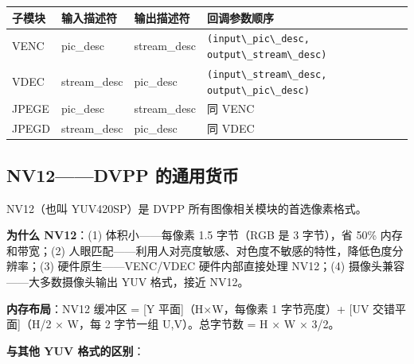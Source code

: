 \begin{longtable}[]{@{}
  >{\raggedright\arraybackslash}p{}
  >{\raggedright\arraybackslash}p{}
  >{\raggedright\arraybackslash}p{}
  >{\raggedright\arraybackslash}p{}@{}}
\toprule\noalign{}
\begin{minipage}[b]{\linewidth}\raggedright
子模块
\end{minipage} & \begin{minipage}[b]{\linewidth}\raggedright
输入描述符
\end{minipage} & \begin{minipage}[b]{\linewidth}\raggedright
输出描述符
\end{minipage} & \begin{minipage}[b]{\linewidth}\raggedright
回调参数顺序
\end{minipage} \\
\midrule\noalign{}
\endhead
\bottomrule\noalign{}
\endlastfoot
VENC & pic\_desc & stream\_desc &
\passthrough{\lstinline!(input\_pic\_desc, output\_stream\_desc)!} \\
VDEC & stream\_desc & pic\_desc &
\passthrough{\lstinline!(input\_stream\_desc, output\_pic\_desc)!} \\
JPEGE & pic\_desc & stream\_desc & 同 VENC \\
JPEGD & stream\_desc & pic\_desc & 同 VDEC \\
\end{longtable}

\subsection{NV12------DVPP 的通用货币}\label{nv12-format}

NV12（也叫 YUV420SP）是 DVPP 所有图像相关模块的首选像素格式。

\textbf{为什么 NV12}：(1) 体积小------每像素 1.5 字节（RGB 是 3
字节），省 50\% 内存和带宽；(2)
人眼匹配------利用人对亮度敏感、对色度不敏感的特性，降低色度分辨率；(3)
硬件原生------VENC/VDEC 硬件内部直接处理 NV12；(4)
摄像头兼容------大多数摄像头输出 YUV 格式，接近 NV12。

\textbf{内存布局}：NV12 缓冲区 = {[}Y 平面{]}（H×W，每像素 1 字节亮度）+
{[}UV 交错平面{]}（H/2 × W，每 2 字节一组 U,V）。总字节数 = H × W ×
3/2。

\textbf{与其他 YUV 格式的区别}：

